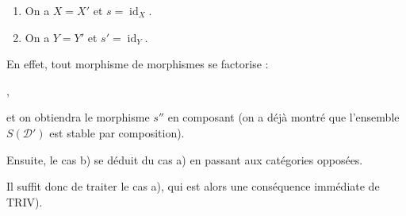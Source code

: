\begin{enumerate}
\renewcommand{\labelenumi}{\emph{\alph{enumi})}}
  \item {}%
  On a $X=X'$ et $s=\operatorname{id}_X$.
  \item {}%
  On a $Y=Y'$ et $s'=\operatorname{id}_Y$.
\end{enumerate}

En effet, tout morphisme de morphismes se factorise :

\begin{center}
  \quad ,
\end{center}

\noindent et on obtiendra le morphisme $s''$ en composant (on a déjà montré
que l'ensemble $S(\mathcal D')$ est stable par composition).

Ensuite, le cas b) se déduit du cas a) en passant aux catégories opposées.

Il suffit donc de traiter le cas a), qui est alors une conséquence immédiate
de TRIV).

\endgroup
